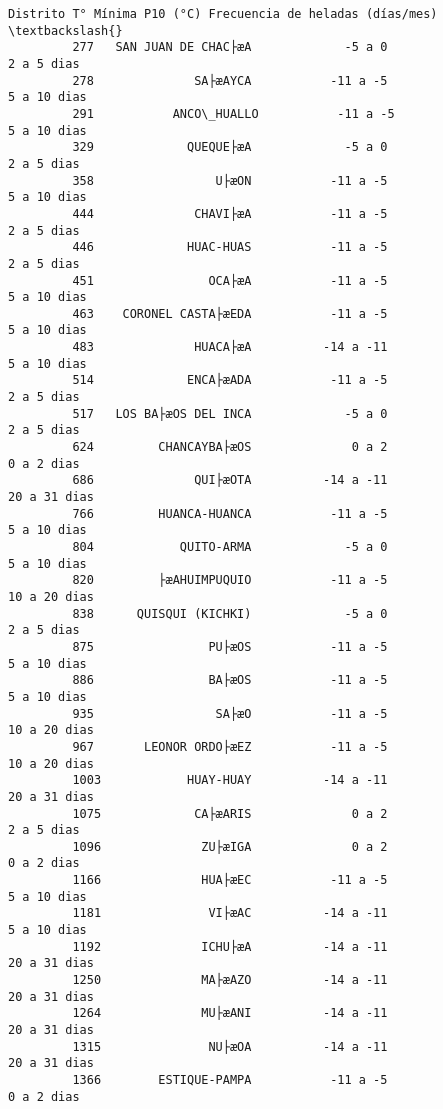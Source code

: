 \documentclass[11pt]{article}
\begin{document}
\begin{Verbatim}[commandchars=\\\{\}]
                          Distrito T° Mínima P10 (°C) Frecuencia de heladas (días/mes)  \textbackslash{}
         277   SAN JUAN DE CHAC├æA             -5 a 0                       2 a 5 dias   
         278              SA├æAYCA           -11 a -5                      5 a 10 dias   
         291           ANCO\_HUALLO           -11 a -5                      5 a 10 dias   
         329             QUEQUE├æA             -5 a 0                       2 a 5 dias   
         358                 U├æON           -11 a -5                      5 a 10 dias   
         444              CHAVI├æA           -11 a -5                       2 a 5 dias   
         446             HUAC-HUAS           -11 a -5                       2 a 5 dias   
         451                OCA├æA           -11 a -5                      5 a 10 dias   
         463    CORONEL CASTA├æEDA           -11 a -5                      5 a 10 dias   
         483              HUACA├æA          -14 a -11                      5 a 10 dias   
         514             ENCA├æADA           -11 a -5                       2 a 5 dias   
         517   LOS BA├æOS DEL INCA             -5 a 0                       2 a 5 dias   
         624         CHANCAYBA├æOS              0 a 2                       0 a 2 dias   
         686              QUI├æOTA          -14 a -11                     20 a 31 dias   
         766         HUANCA-HUANCA           -11 a -5                      5 a 10 dias   
         804            QUITO-ARMA             -5 a 0                      5 a 10 dias   
         820         ├æAHUIMPUQUIO           -11 a -5                     10 a 20 dias   
         838      QUISQUI (KICHKI)             -5 a 0                       2 a 5 dias   
         875                PU├æOS           -11 a -5                      5 a 10 dias   
         886                BA├æOS           -11 a -5                      5 a 10 dias   
         935                 SA├æO           -11 a -5                     10 a 20 dias   
         967       LEONOR ORDO├æEZ           -11 a -5                     10 a 20 dias   
         1003            HUAY-HUAY          -14 a -11                     20 a 31 dias   
         1075             CA├æARIS              0 a 2                       2 a 5 dias   
         1096              ZU├æIGA              0 a 2                       0 a 2 dias   
         1166              HUA├æEC           -11 a -5                      5 a 10 dias   
         1181               VI├æAC          -14 a -11                      5 a 10 dias   
         1192              ICHU├æA          -14 a -11                     20 a 31 dias   
         1250              MA├æAZO          -14 a -11                     20 a 31 dias   
         1264              MU├æANI          -14 a -11                     20 a 31 dias   
         1315               NU├æOA          -14 a -11                     20 a 31 dias   
         1366        ESTIQUE-PAMPA           -11 a -5                       0 a 2 dias   
         

\end{Verbatim}
\end{document}
